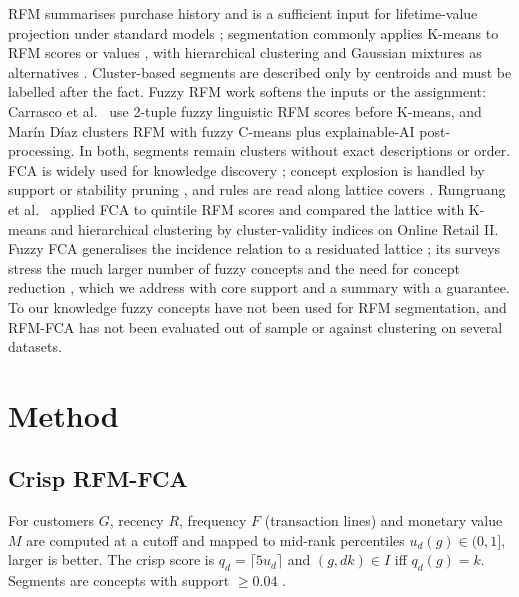 \documentclass[conference]{IEEEtran}
\begin{document}
RFM summarises purchase history and is a sufficient input for lifetime-value projection under standard models \cite{fader2005}; segmentation commonly applies K-means to RFM scores or values \cite{chen2012}, with hierarchical clustering and Gaussian mixtures as alternatives \cite{wedel2000}. Cluster-based segments are described only by centroids and must be labelled after the fact. Fuzzy RFM work softens the inputs or the assignment: Carrasco et al.\ \cite{carrasco2019} use 2-tuple fuzzy linguistic RFM scores before K-means, and Marín Díaz \cite{marindiaz2025} clusters RFM with fuzzy C-means \cite{bezdek1981} plus explainable-AI post-processing. In both, segments remain clusters without exact descriptions or order. FCA is widely used for knowledge discovery \cite{poelmans2013app,singh2016}; concept explosion is handled by support or stability pruning \cite{kuznetsov2007}, and rules are read along lattice covers \cite{luxenburger1991}. Rungruang et al.\ \cite{rungruang2024} applied FCA to quintile RFM scores and compared the lattice with K-means and hierarchical clustering by cluster-validity indices on Online Retail II. Fuzzy FCA generalises the incidence relation to a residuated lattice \cite{burusco1994,pollandt1997,belohlavek2002}; its surveys stress the much larger number of fuzzy concepts and the need for concept reduction \cite{poelmans2014,alwersh2022}, which we address with core support and a summary with a guarantee. To our knowledge fuzzy concepts have not been used for RFM segmentation, and RFM-FCA has not been evaluated out of sample or against clustering on several datasets.

\section{Method}

\subsection{Crisp RFM-FCA}
For customers $G$, recency $R$, frequency $F$ (transaction lines) and monetary value $M$ are computed at a cutoff and mapped to mid-rank percentiles $u_d(g)\in(0,1]$, larger is better. The crisp score is $q_d = \lceil 5u_d\rceil$ and $(g,dk)\in I$ iff $q_d(g)=k$. Segments are concepts with support $\ge 0.04$ \cite{rungruang2024}.
\end{document}

